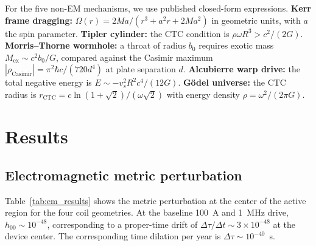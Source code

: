 \documentclass[11pt,a4paper,twocolumn]{article}
\begin{document}
For the five non-EM mechanisms, we use published closed-form
expressions. \textbf{Kerr frame dragging:}
$\Omega(r) = 2Ma/(r^3 + a^2 r + 2Ma^2)$ in geometric units, with $a$
the spin parameter. \textbf{Tipler cylinder:} the CTC condition is
$\rho\omega R^3 > c^2/(2G)$. \textbf{Morris--Thorne wormhole:} a throat
of radius $b_0$ requires exotic mass $M_{\text{ex}} \sim c^2 b_0/G$,
compared against the Casimir maximum
$|\rho_{\text{Casimir}}| = \pi^2 \hbar c / (720 d^4)$ at plate
separation $d$. \textbf{Alcubierre warp drive:} the total negative
energy is $E \sim -v_s^2 R^2 c^4/(12G)$. \textbf{G\"odel universe:}
the CTC radius is $r_{\text{CTC}} = c\ln(1+\sqrt{2})/(\omega\sqrt{2})$
with energy density $\rho = \omega^2/(2\pi G)$.

\section{Results}
\label{sec:results}

\subsection{Electromagnetic metric perturbation}
\label{subsec:em_results}

Table~\ref{tab:em_results} shows the metric perturbation at the
center of the active region for the four coil geometries. At the
baseline 100~A and 1~MHz drive, $h_{00} \sim 10^{-48}$, corresponding
to a proper-time drift of $\Delta\tau/\Delta t \sim 3\times 10^{-48}$
at the device center. The corresponding time dilation per year is
$\Delta\tau \sim 10^{-40}$~s.

\begin{table}[t]
\centering
\small
\caption{EM-induced metric perturbation at device center
(baseline 100~A, 1~MHz).}
\label{tab:em_results}
\end{table}
\end{document}
